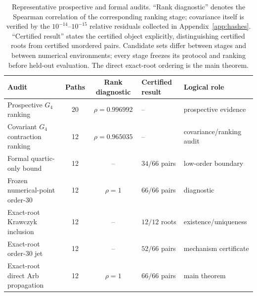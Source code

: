 \documentclass[11pt]{article}
\begin{document}
\begin{table}[t]
\centering
\caption{Representative prospective and formal audits. ``Rank diagnostic'' denotes the Spearman correlation of the corresponding ranking stage; covariance itself is verified by the $10^{-14}$--$10^{-15}$ relative residuals collected in Appendix~\ref{app:hashes}. ``Certified result'' states the certified object explicitly, distinguishing certified roots from certified unordered pairs. Candidate sets differ between stages and between numerical environments; every stage freezes its protocol and ranking before held-out evaluation. The direct exact-root ordering is the main theorem.}
\label{tab:results}
\small
\begin{tabular}{>{\raggedright\arraybackslash}p{4.2cm}cc>{\raggedright\arraybackslash}p{1.9cm}>{\raggedright\arraybackslash}p{3.4cm}}
\toprule
Audit & Paths & Rank diagnostic & Certified result & Logical role\\
\midrule
Prospective $G_4$ ranking & 20 & $\rho=0.996992$ & -- & prospective evidence\\
Covariant $G_4$ contraction ranking & 12 & $\rho=0.965035$ & -- & covariance/ranking audit\\
Formal quartic-only bound & 12 & -- & $34/66$ pairs & low-order boundary\\
Frozen numerical-point order-30 & 12 & $\rho=1$ & $66/66$ pairs & diagnostic\\
Exact-root Krawczyk inclusion & 12 & -- & $12/12$ roots & existence/uniqueness\\
Exact-root order-30 jet & 12 & -- & $52/66$ pairs & mechanism certificate\\
Exact-root direct Arb propagation & 12 & $\rho=1$ & $66/66$ pairs & main theorem\\
\bottomrule
\end{tabular}
\end{table}
\end{document}
